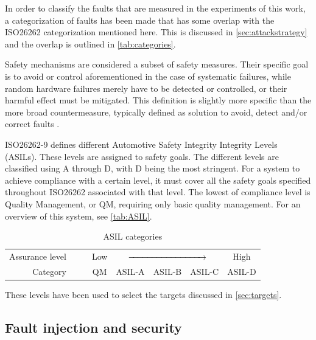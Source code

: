 \documentclass[10pt]{article}
\begin{document}
    In order to classify the faults that are measured in the experiments of this work, a categorization of faults has been made that has some overlap with the ISO26262 categorization mentioned here. This is discussed in \autoref{sec:attackstrategy} and the overlap is outlined in \autoref{tab:categories}.

    Safety mechanisms are considered a subset of safety measures. Their specific goal is to avoid or control aforementioned in the case of systematic failures, while random hardware failures merely have to be detected or controlled, or their harmful effect must be mitigated. This definition is slightly more specific than the more broad countermeasure, typically defined as solution to avoid, detect and/or  correct faults \cite{bar-el_sorcerers_2006}.

    ISO26262-9 \cite{iso26262-9} defines different Automotive Safety Integrity Integrity Levels (ASILs). These levels are assigned to safety goals. %
    The different levels are classified using A through D, with D being the most stringent. For a system to achieve compliance with a certain level, it must cover all the safety goals specified throughout ISO26262 \cite{iso26262} associated with that level. 
    The lowest of compliance level is Quality Management, or QM, requiring only basic quality management. For an overview of this system, see \autoref{tab:ASIL}.

    \begin{table}[H]
        \centering
        \begin{tabular}{rccccccc}
        \toprule
        Assurance level &&& Low &  \multicolumn{3}{c}{$\xrightarrow{\hspace*{3cm}}$}      & High \\
        Category        &&& QM  & ASIL-A & ASIL-B & ASIL-C & ASIL-D \\
        \bottomrule
        \end{tabular}
        \caption{ASIL categories} 
        \label{tab:ASIL}
    \end{table}

    \noindent These levels have been used to select the targets discussed in \autoref{sec:targets}.%

  \subsection{Fault injection and security }
  \label{sec:fi+security}
\end{document}

